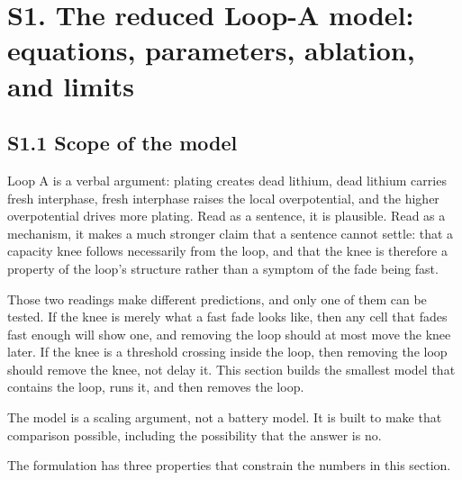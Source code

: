 \documentclass[11pt,a4paper]{article}
\begin{document}
\section*{S1. The reduced Loop-A model: equations, parameters, ablation, and limits}


\subsection*{S1.1 Scope of the model}


Loop A is a verbal argument: plating creates dead lithium, dead lithium carries fresh interphase, fresh interphase raises the local overpotential, and the higher overpotential drives more plating. Read as a sentence, it is plausible. Read as a mechanism, it makes a much stronger claim that a sentence cannot settle: that a capacity knee follows necessarily from the loop, and that the knee is therefore a property of the loop's structure rather than a symptom of the fade being fast.


Those two readings make different predictions, and only one of them can be tested. If the knee is merely what a fast fade looks like, then any cell that fades fast enough will show one, and removing the loop should at most move the knee later. If the knee is a threshold crossing inside the loop, then removing the loop should remove the knee, not delay it. This section builds the smallest model that contains the loop, runs it, and then removes the loop.


The model is a scaling argument, not a battery model. It is built to make that comparison possible, including the possibility that the answer is no.


The formulation has three properties that constrain the numbers in this section.
\end{document}

